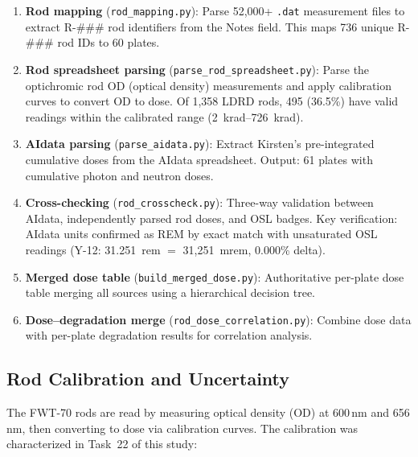 \documentclass[11pt,letterpaper]{article}
\begin{document}
\begin{enumerate}
    \item \textbf{Rod mapping} (\texttt{rod\_mapping.py}): Parse 52,000+
    \texttt{.dat} measurement files to extract R-\#\#\# rod identifiers from
    the Notes field. This maps 736 unique R-\#\#\# rod IDs to 60 plates.

    \item \textbf{Rod spreadsheet parsing} (\texttt{parse\_rod\_spreadsheet.py}):
    Parse the optichromic rod OD (optical density) measurements and apply
    calibration curves to convert OD to dose. Of 1,358 LDRD rods, 495 (36.5\%)
    have valid readings within the calibrated range (\SIrange{2}{726}{krad}).

    \item \textbf{AIdata parsing} (\texttt{parse\_aidata.py}): Extract Kirsten's
    pre-integrated cumulative doses from the AIdata spreadsheet. Output: 61
    plates with cumulative photon and neutron doses.

    \item \textbf{Cross-checking} (\texttt{rod\_crosscheck.py}): Three-way
    validation between AIdata, independently parsed rod doses, and OSL badges.
    Key verification: AIdata units confirmed as REM by exact match with
    unsaturated OSL readings (Y-12: 31.251~rem $=$ 31,251~mrem, 0.000\% delta).

    \item \textbf{Merged dose table} (\texttt{build\_merged\_dose.py}):
    Authoritative per-plate dose table merging all sources using a hierarchical
    decision tree.

    \item \textbf{Dose--degradation merge} (\texttt{rod\_dose\_correlation.py}):
    Combine dose data with per-plate degradation results for correlation
    analysis.
\end{enumerate}

\subsection{Rod Calibration and Uncertainty}
\label{sec:rod_calibration}

The FWT-70 rods are read by measuring optical density (OD) at 600\,nm and
656\,nm, then converting to dose via calibration curves. The calibration was
characterized in Task~22 of this study:
\end{document}
